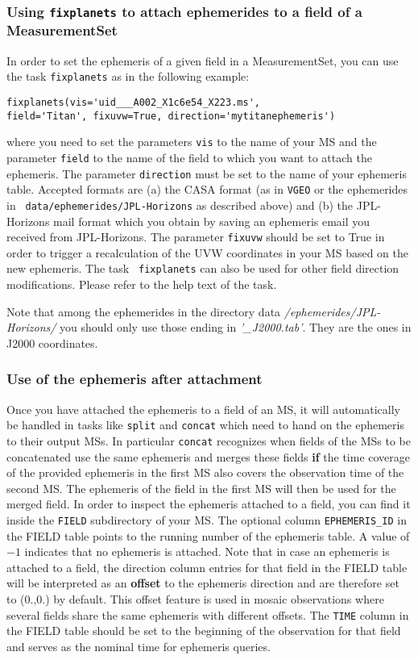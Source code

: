 \subsubsection{Using {\tt fixplanets} to attach ephemerides to a field
  of a MeasurementSet}
In order to set the ephemeris of a given field in a MeasurementSet,
you can use the task {\tt fixplanets} as in the following example:

\small
\begin{verbatim}    
fixplanets(vis='uid___A002_X1c6e54_X223.ms',
field='Titan', fixuvw=True, direction='mytitanephemeris')
\end{verbatim}
\normalsize

where you need to set the parameters {\tt vis} to the name of your MS
and the parameter {\tt field} to the name of the field to which you
want to attach the ephemeris. The parameter {\tt direction} must be set
to the name of your ephemeris table. Accepted formats are (a) the CASA
format (as in {\tt VGEO} or the ephemerides in {\tt
  data/ephemerides/JPL-Horizons} as described above)  and (b) the
JPL-Horizons mail format which you obtain by saving an ephemeris
email you received from JPL-Horizons. The parameter {\tt fixuvw} should
be set to True in order to trigger a recalculation of the UVW
coordinates in your MS based on the new ephemeris. The task {\tt
  fixplanets} can also be used for other field direction
modifications. Please refer to the help text of the task.


Note that among the ephemerides in the directory data {\it
  /ephemerides/JPL-Horizons/} you should only use those ending in {\it
  '\_J2000.tab'}. They are the ones in J2000 coordinates.

\subsubsection{Use of the ephemeris after attachment}
\label{section:cal.eph.manip.attach}
Once you have attached the ephemeris to a field of an MS, it will
automatically be handled in tasks like {\tt split} and {\tt concat}
which need to hand on the ephemeris to their output MSs. In particular
{\tt concat} recognizes when fields of the MSs to be concatenated use
the same ephemeris and merges these fields {\bf if} the time coverage
of the provided ephemeris in the first MS also covers the observation
time of the second MS. The ephemeris of the field in the first MS will
then be used for the merged field. In order to inspect the ephemeris
attached to a field, you can find it inside the {\tt FIELD}
subdirectory of your MS. The optional column {\tt EPHEMERIS\_ID} in the
FIELD table points to the running number of the ephemeris table. A
value of $-1$ indicates that no ephemeris is attached. Note that in case
an ephemeris is attached to a field, the direction column entries for
that field in the FIELD table will be interpreted as an {\bf offset}
to the ephemeris direction and are therefore set to (0.,0.) by default.
This offset feature is used in mosaic observations where several
fields share the same ephemeris with different offsets. The {\tt TIME}
column in the FIELD table should be set to the beginning of the
observation for that field and serves as the nominal time for ephemeris
queries.

